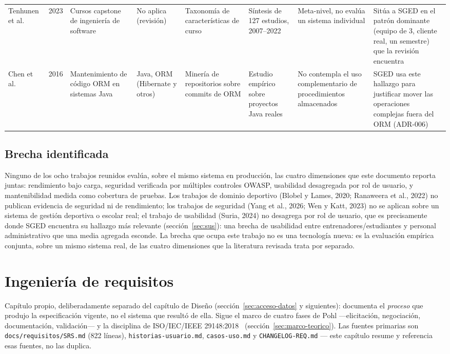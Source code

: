 \documentclass[11pt,a4paper]{article}
\newcommand{\ruta}[1]{\texttt{\footnotesize #1}}
\begin{document}
\begin{longtable}{p{2.0cm} p{0.7cm} p{1.8cm} p{1.9cm} p{1.9cm} p{2.4cm} p{2.2cm} p{2.6cm}}
Tenhunen et al.~\cite{tenhunen2023capstone} & 2023 & Cursos capstone de ingeniería de software & No aplica (revisión) & Taxonomía de características de curso & Síntesis de 127 estudios, 2007--2022 & Meta-nivel, no evalúa un sistema individual & Sitúa a SGED en el patrón dominante (equipo de 3, cliente real, un semestre) que la revisión encuentra \\
Chen et al.~\cite{chen2016orm} & 2016 & Mantenimiento de código ORM en sistemas Java & Java, ORM (Hibernate y otros) & Minería de repositorios sobre commits de ORM & Estudio empírico sobre proyectos Java reales & No contempla el uso complementario de procedimientos almacenados & SGED usa este hallazgo para justificar mover las operaciones complejas fuera del ORM (ADR-006) \\
\bottomrule
\end{longtable}

\subsection{Brecha identificada}

Ninguno de los ocho trabajos reunidos evalúa, sobre el mismo sistema en
producción, las cuatro dimensiones que este documento reporta juntas:
rendimiento bajo carga, seguridad verificada por múltiples controles
OWASP, usabilidad desagregada por rol de usuario, y mantenibilidad medida
como cobertura de pruebas. Los trabajos de dominio deportivo
(Blobel y Lames, 2020; Ranaweera et al., 2022) no publican evidencia de
seguridad ni de rendimiento; los trabajos de seguridad (Yang et al., 2026;
Wen y Katt, 2023) no se aplican sobre un sistema de gestión deportiva o
escolar real; el trabajo de usabilidad (Suria, 2024) no desagrega por rol
de usuario, que es precisamente donde SGED encuentra su hallazgo más
relevante (sección~\ref{sec:sus}): una brecha de usabilidad entre
entrenadores/estudiantes y personal administrativo que una media agregada
esconde. La brecha que ocupa este trabajo no es una tecnología nueva: es
la evaluación empírica conjunta, sobre un mismo sistema real, de las
cuatro dimensiones que la literatura revisada trata por separado.

\section{Ingeniería de requisitos}
\label{sec:ingenieria-requisitos}

Capítulo propio, deliberadamente separado del capítulo de Diseño
(sección~\ref{sec:acceso-datos} y siguientes): documenta el \emph{proceso}
que produjo la especificación vigente, no el sistema que resultó de ella.
Sigue el marco de cuatro fases de Pohl —elicitación, negociación,
documentación, validación— y la disciplina de
ISO/IEC/IEEE 29148:2018~\cite{iso29148,pohl2010} (sección~\ref{sec:marco-teorico}).
Las fuentes primarias son \ruta{docs/requisitos/SRS.md} (822 líneas),
\ruta{historias-usuario.md}, \ruta{casos-uso.md} y
\ruta{CHANGELOG-REQ.md} — este capítulo resume y referencia esas fuentes,
no las duplica.
\end{document}
